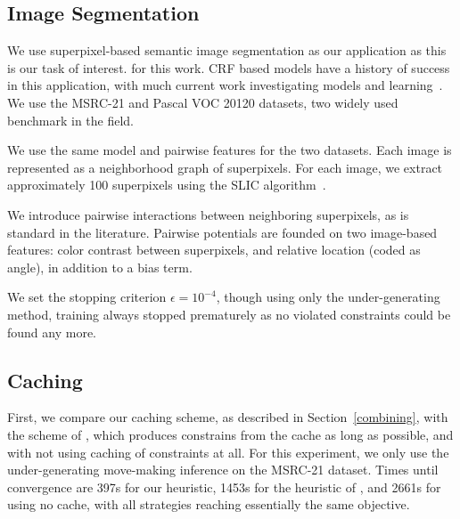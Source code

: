 

\subsection{Image Segmentation}
We use superpixel-based semantic image segmentation as our application as this is our task of interest. %
for this work.  CRF based models have a history of success in this application,
with much current work investigating models and
learning~\citep{gonfaus2010harmony, lucchi2013learning, ladicky2009associative,
kohli2009robust, krahenbuhl2012efficient}.  We use the MSRC-21 and Pascal VOC 20120 datasets, two
widely used benchmark in the field.

We use the same model and pairwise features for the two datasets.
Each image is represented as a neighborhood graph of superpixels.
For each image, we extract approximately 100 superpixels using 
the SLIC algorithm~\citep{achanta2012slic}.

We introduce pairwise interactions between neighboring superpixels, as is
standard in the literature. Pairwise potentials are founded on two
image-based features: color contrast between superpixels, and relative location
(coded as angle), in addition to a bias term.

We set the stopping criterion $\epsilon=10^{-4}$, though using only
the under-generating method, training always stopped prematurely as no violated
constraints could be found any more.

\subsection{Caching}
First, we compare our caching scheme, as described in Section~\ref{combining}, with the
scheme of \citet{joachims2009cutting}, which produces constrains from the cache
as long as possible, and with not using caching of constraints at all.  For this experiment,
we only use the under-generating move-making inference on the MSRC-21 dataset. Times until convergence
are 397s for our heuristic, 1453s for the heuristic of
\citet{joachims2009cutting}, and 2661s for using no cache, with all strategies
reaching essentially the same objective.

